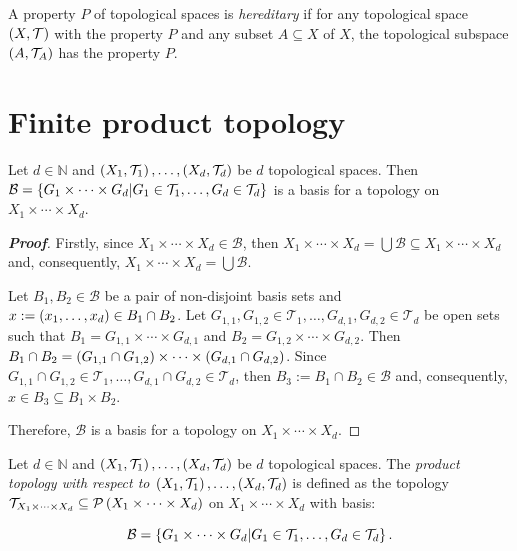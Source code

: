 \begin{definition}
  A property $P$ of topological spaces is \textit{hereditary} if for any topological space $\left(X,\mathcal{T}\right)$ with the property $P$ and any subset $A\subseteq X$ of $X$, the topological subspace $\left(A,\mathcal{T}_A\right)$ has the property $P$.
\end{definition}

\section{Finite product topology}

\begin{proposition}
  Let $d\in\mathbb{N}$ and $\left(X_1,\mathcal{T}_1\right),\dots,\left(X_d,\mathcal{T}_d\right)$ be $d$ topological spaces. Then $\mathcal{B}=\left\{G_1\times\cdots\times G_d\middle|G_1\in\mathcal{T}_1,\dots,G_d\in\mathcal{T}_d\right\}$ is a basis for a topology on $X_1\times\cdots\times X_d$.
  \begin{proof}[\rm\textbf{Proof}]
    Firstly, since $X_1\times\cdots\times X_d\in\mathcal{B}$, then $X_1\times\cdots\times X_d=\bigcup{\mathcal{B}}\subseteq X_1\times\cdots\times X_d$ and, consequently, $X_1\times\cdots\times X_d=\bigcup{\mathcal{B}}$. 
    
    Let $B_1,B_2\in\mathcal{B}$ be a pair of non-disjoint basis sets and $x:=\left(x_1,\dots,x_d\right)\in B_1\cap B_2$. Let $G_{1,1},G_{1,2}\in\mathcal{T}_1,\dots,G_{d,1},G_{d,2}\in\mathcal{T}_d$ be open sets such that $B_1=G_{1,1}\times\cdots\times G_{d,1}$ and $B_2=G_{1,2}\times\cdots\times G_{d,2}$. Then $B_1\cap B_2=\left(G_{1,1}\cap G_{1,2}\right)\times\cdots\times\left(G_{d,1}\cap G_{d,2}\right)$. Since $G_{1,1}\cap G_{1,2}\in\mathcal{T}_1,\dots,G_{d,1}\cap G_{d,2}\in\mathcal{T}_d$, then $B_3:=B_1\cap B_2\in\mathcal{B}$ and, consequently, $x\in B_3\subseteq B_1\times B_2$. 
    
    Therefore, $\mathcal{B}$ is a basis for a topology on $X_1\times\cdots\times X_d$.
  \end{proof}
\end{proposition}

\begin{definition}
  Let $d\in\mathbb{N}$ and $\left(X_1,\mathcal{T}_1\right),\dots,\left(X_d,\mathcal{T}_d\right)$ be $d$ topological spaces. The \emph{product topology with respect to $\left(X_1,\mathcal{T}_1\right),\dots,\left(X_d,\mathcal{T}_d\right)$} is defined as the topology $\mathcal{T}_{X_1\times\cdots\times X_d}\subseteq\mathcal{P}\left(X_1\times\cdots\times X_d\right)$ on $X_1\times\cdots\times X_d$ with basis:

  \begin{equation}
    \mathcal{B}=\left\{G_1\times\cdots\times G_d\middle|G_1\in\mathcal{T}_1,\dots,G_d\in\mathcal{T}_d\right\}.
  \end{equation}
\end{definition}

